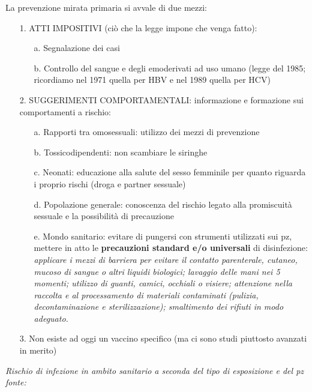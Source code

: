La prevenzione mirata primaria si
avvale di due mezzi:

\begin{itemize}

\item[1.]
  ATTI IMPOSITIVI (ciò che la legge impone che venga fatto):

  \begin{itemize}
  \item[a.]
    Segnalazione dei casi
  \item[b.]
    Controllo del sangue e degli emoderivati ad uso umano (legge del
    1985; ricordiamo nel 1971 quella per HBV e nel 1989 quella per HCV)
  \end{itemize}
  
\item[2.]
  SUGGERIMENTI COMPORTAMENTALI: informazione e formazione sui
  comportamenti a rischio:

  \begin{itemize}
 
  \item[a.]
    Rapporti tra omosessuali: utilizzo dei mezzi di prevenzione
  \item[b.]
    Tossicodipendenti: non scambiare le siringhe
  \item[c.]
    Neonati: educazione alla salute del sesso femminile per quanto
    riguarda i proprio rischi (droga e partner sessuale)
  \item[d.]
    Popolazione generale: conoscenza del rischio legato alla promiscuità
    sessuale e la possibilità di precauzione
  \item[e.]
    Mondo sanitario: evitare di pungersi con strumenti utilizzati sui
    pz, mettere in atto le \textbf{precauzioni standard e/o universali}
    di disinfezione: \emph{applicare i mezzi di barriera per evitare il
    contatto parenterale, cutaneo, mucoso di sangue o altri liquidi
    biologici; lavaggio delle mani nei 5 momenti; utilizzo di guanti,
    camici, occhiali o visiere; attenzione nella raccolta e al
    processamento di materiali contaminati (pulizia, decontaminazione e
    sterilizzazione); smaltimento dei rifiuti in modo adeguato.}
  \end{itemize}
\item[3.]
  Non esiste ad oggi un vaccino specifico (ma ci sono studi piuttosto
  avanzati in merito)
\end{itemize}

\emph{Rischio di infezione in ambito sanitario a seconda del tipo di
esposizione e del pz fonte:}

